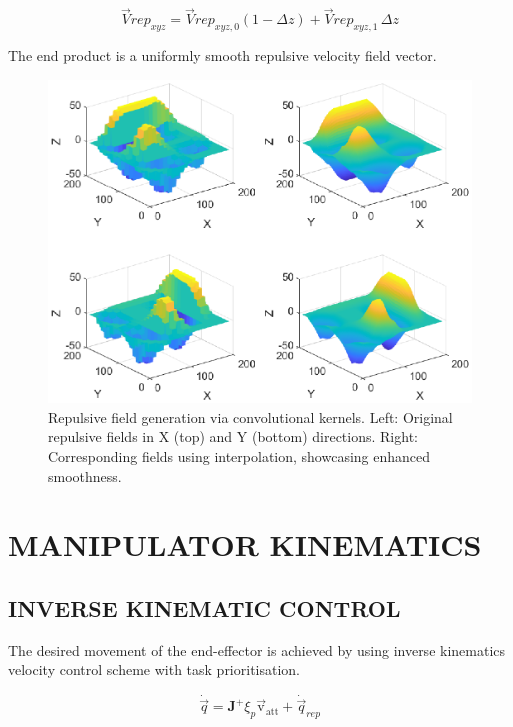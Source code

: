\documentclass[letterpaper, 10 pt, conference]{ieeeconf}  %
\begin{document}
\begin{equation}
	\label{eq: interp z}
	\vec{V}rep_{xyz} = \vec{V}rep_{xyz,0}(1 - \Delta z) + \vec{V}rep_{xyz,1} \, \Delta z 
\end{equation}

The end product is a uniformly smooth repulsive velocity field vector. 


\begin{figure}
	\centering
	\includegraphics[width=1\linewidth]{non_and_interp_4_plots.eps} 
	\caption{Repulsive field generation via convolutional kernels. Left: Original repulsive fields in X (top) and Y (bottom) directions. Right: Corresponding fields using interpolation, showcasing enhanced smoothness.}
	\label{fig:interp-experiment}
\end{figure}

\section{MANIPULATOR KINEMATICS}

\subsection{INVERSE KINEMATIC CONTROL}

The desired movement of the end-effector is achieved by using inverse kinematics velocity control scheme with task prioritisation. 

\begin{equation}
	\dot{\vec{q}} = \mathbf{J}^+ \xi_{p} \mathrm{\vec{v}_{att}} + \dot{\vec{q}}_{rep}
\end{equation}
\end{document}
